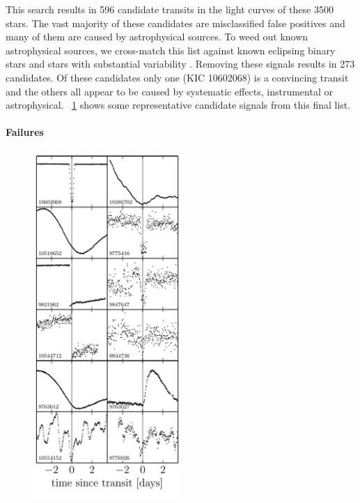 \documentclass[12pt,preprint]{aastex}
\newcommand{\figref}[1]{\ref{fig:#1}}
\newcommand{\Fig}[1]{\figurename~\figref{#1}}
\newcommand{\figlabel}[1]{\label{fig:#1}}
\begin{document}
This search results in 596 candidate transits in the light curves of these
3500 stars.
The vast majority of these candidates are misclassified false positives and
many of them are caused by astrophysical sources.
To weed out known astrophysical sources, we cross-match this list against
known eclipsing binary stars \citep{Matijevic:2012} and stars with substantial
variability \citep{McQuillan:2014}.
Removing these signals results in 273 candidates.
Of these candidates only one (KIC 10602068) is a convincing transit and the
others all appear to be caused by systematic effects, instrumental or
astrophysical.
\Fig{candidates} shows some representative candidate signals from this final
list.

\paragraph{Failures}


\begin{figure}[p]
\begin{center}
\includegraphics[width=0.5\textwidth]{figures/candidates.pdf}
\end{center}
\caption{%
\figlabel{candidates}}
\end{figure}
\end{document}
